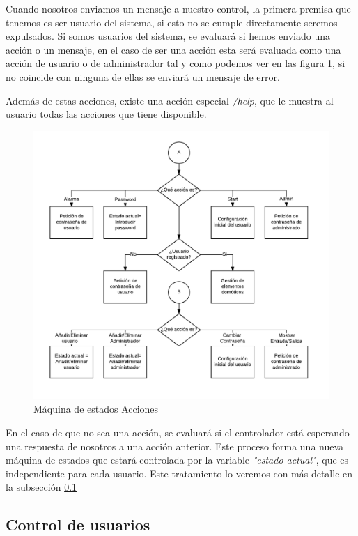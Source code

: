 \documentclass[10pt,journal,compsoc]{IEEEtran}
\begin{document}
Cuando nosotros enviamos un mensaje a nuestro control, la primera premisa que tenemos es 
ser usuario del sistema, si esto no se cumple directamente seremos expulsados.
Si somos usuarios del sistema, se evaluará si hemos enviado una acción o un mensaje, en el 
caso de ser una acción esta será evaluada como una acción de usuario o de administrador tal y 
como podemos ver en las figura \ref{fig:MaqEstAcc}, si no coincide con ninguna de ellas se 
enviará un mensaje de error.

Además de estas acciones, existe una acción especial \textit{/help}, que le muestra al usuario 
todas las acciones que tiene disponible.

\begin{figure}[h]
\centering
\includegraphics[scale=0.4]{MaqEstAcc}
\caption{Máquina de estados Acciones}
\label{fig:MaqEstAcc}
\end{figure}

En el caso de que no sea una acción, se evaluará si el controlador está esperando una respuesta 
de nosotros a una acción anterior. Este proceso forma una nueva máquina de estados que estará 
controlada por la variable \textit{"estado actual"}, que es independiente para cada usuario.
Este tratamiento lo veremos con más detalle en la subsección \ref{sec:ControlUsuarios}

\subsection{Control de usuarios}\label{sec:ControlUsuarios}
\end{document}
